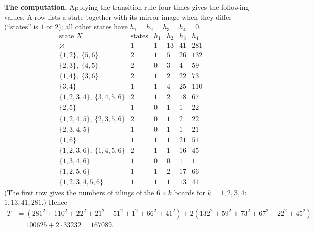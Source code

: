 \textbf{The computation.} Applying the transition rule four times gives the following values. A row lists a state together with its mirror image when they differ (``states'' is $1$ or $2$); all other states have $h_1=h_2=h_3=h_4=0$.
\[\begin{array}{lcrrrr}
\text{state }X & \text{states} & h_1 & h_2 & h_3 & h_4\\ \hline
\varnothing & 1 & 1 & 13 & 41 & 281\\
\{1,2\},\ \{5,6\} & 2 & 1 & 5 & 26 & 132\\
\{2,3\},\ \{4,5\} & 2 & 0 & 3 & 4 & 59\\
\{1,4\},\ \{3,6\} & 2 & 1 & 2 & 22 & 73\\
\{3,4\} & 1 & 1 & 4 & 25 & 110\\
\{1,2,3,4\},\ \{3,4,5,6\} & 2 & 1 & 2 & 18 & 67\\
\{2,5\} & 1 & 0 & 1 & 1 & 22\\
\{1,2,4,5\},\ \{2,3,5,6\} & 2 & 0 & 1 & 2 & 22\\
\{2,3,4,5\} & 1 & 0 & 1 & 1 & 21\\
\{1,6\} & 1 & 1 & 1 & 21 & 51\\
\{1,2,3,6\},\ \{1,4,5,6\} & 2 & 1 & 1 & 16 & 45\\
\{1,3,4,6\} & 1 & 0 & 0 & 1 & 1\\
\{1,2,5,6\} & 1 & 1 & 2 & 17 & 66\\
\{1,2,3,4,5,6\} & 1 & 1 & 1 & 13 & 41
\end{array}\]
(The first row gives the numbers of tilings of the $6\times k$ boards for $k=1,2,3,4$: $1,13,41,281$.) Hence
\begin{align*}
T&=\left(281^2+110^2+22^2+21^2+51^2+1^2+66^2+41^2\right)+2\left(132^2+59^2+73^2+67^2+22^2+45^2\right)\\
&=100625+2\cdot33232=\boxed{167089}.
\end{align*}

